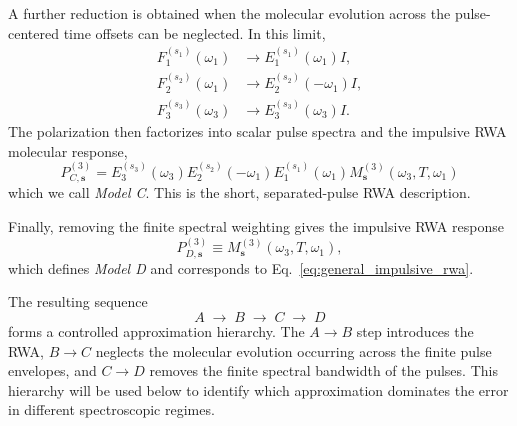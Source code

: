 A further reduction is obtained when the molecular evolution across the
pulse-centered time offsets can be neglected. In this limit,
%
\begin{align}
F_1^{(s_1)}(\omega_1)
&\rightarrow
E_1^{(s_1)}(\omega_1)I,
\\
F_2^{(s_2)}(\omega_1)
&\rightarrow
E_2^{(s_2)}(-\omega_1)I,
\\
F_3^{(s_3)}(\omega_3)
&\rightarrow
E_3^{(s_3)}(\omega_3)I.
\end{align}
%
The polarization then factorizes into scalar pulse spectra and the
impulsive RWA molecular response,
%
\begin{equation}
\boxed{
P_{C,\mathbf{s}}^{(3)}
=
E_3^{(s_3)}(\omega_3)
E_2^{(s_2)}(-\omega_1)
E_1^{(s_1)}(\omega_1)
M_{\mathbf{s}}^{(3)}
(\omega_3,T,\omega_1)
}
\label{eq:model_C}
\end{equation}
%
which we call \emph{Model C}. This is the short, separated-pulse RWA
description.

Finally, removing the finite spectral weighting gives the impulsive RWA
response
%
\begin{equation}
P_{D,\mathbf{s}}^{(3)}
\equiv
M_{\mathbf{s}}^{(3)}
(\omega_3,T,\omega_1),
\label{eq:model_D}
\end{equation}
%
which defines \emph{Model D} and corresponds to
Eq.~\eqref{eq:general_impulsive_rwa}.

The resulting sequence
%
\begin{equation}
A
\;\longrightarrow\;
B
\;\longrightarrow\;
C
\;\longrightarrow\;
D
\label{eq:approximation_hierarchy}
\end{equation}
%
forms a controlled approximation hierarchy. The $A\rightarrow B$
step introduces the RWA, $B\rightarrow C$ neglects the molecular
evolution occurring across the finite pulse envelopes, and
$C\rightarrow D$ removes the finite spectral bandwidth of the pulses.
This hierarchy will be used below to identify which approximation
dominates the error in different spectroscopic regimes.

